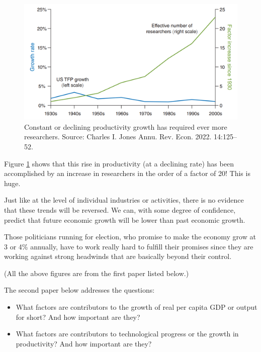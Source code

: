 \documentclass[
]{book}
\providecommand{\tightlist}{%
  \setlength{\itemsep}{0pt}\setlength{\parskip}{0pt}}
\begin{document}
\begin{figure}

{\centering \includegraphics[width=1\linewidth]{img/growth/moore20} 

}

\caption{Constant or declining productivity growth has required ever more researchers. Source: Charles I. Jones Annu. Rev. Econ. 2022. 14:125–52.}\label{fig:growth20}
\end{figure}

Figure \ref{fig:growth20} shows that this rise in productivity (at a declining rate) has been accomplished by an increase in researchers in the order of a factor of 20! This is huge.

Just like at the level of individual industries or activities, there is no evidence that these trends will be reversed. We can, with some degree of confidence, predict that future economic growth will be lower than past economic growth.

Those politicians running for election, who promise to make the economy grow at 3 or 4\% annually, have to work really hard to fulfill their promises since they are working against strong headwinds that are basically beyond their control.

(All the above figures are from the first paper listed below.)

The second paper below addresses the questions:

\begin{itemize}
\tightlist
\item
  What factors are contributors to the growth of real per capita GDP or output for short? And how important are they?
\item
  What factors are contributors to technological progress or the growth in productivity? And how important are they?
\end{itemize}
\end{document}
